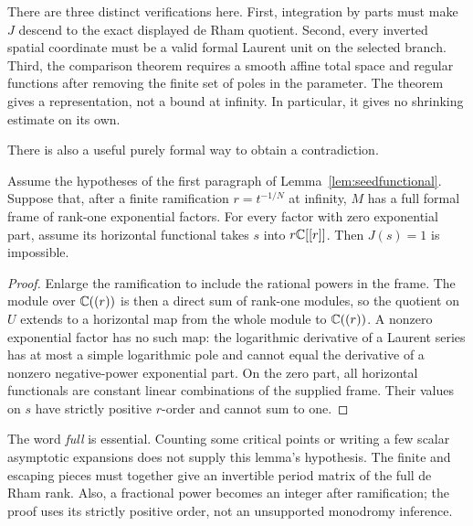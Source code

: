 There are three distinct verifications here. First, integration by
parts must make $J$ descend to the exact displayed de Rham quotient.
Second, every inverted spatial coordinate must be a valid formal
Laurent unit on the selected branch. Third, the comparison theorem
requires a smooth affine total space and regular functions after
removing the finite set of poles in the parameter. The theorem gives
a representation, not a bound at infinity. In particular, it gives
no shrinking estimate on its own.

There is also a useful purely formal way to obtain a contradiction.

\begin{lemma}\label{lem:positiveformal}
Assume the hypotheses of the first paragraph of
Lemma~\ref{lem:seedfunctional}. Suppose that, after a finite ramification
$r=t^{-1/N}$ at infinity, $M$ has a full formal frame of rank-one
exponential factors. For every factor with zero exponential part,
assume its horizontal functional takes $s$ into $r\mathbb C[[r]]$.
Then $J(s)=1$ is impossible.
\end{lemma}
\begin{proof}
Enlarge the ramification to include the rational powers in the frame.
The module over $\mathbb C((r))$ is then a direct sum of rank-one modules,
so the quotient on $U$ extends to a horizontal map from the whole
module to $\mathbb C((r))$. A nonzero exponential factor has no such map:
the logarithmic derivative of a Laurent series has at most a simple
logarithmic pole and cannot equal the derivative of a nonzero
negative-power exponential part. On the zero part, all horizontal
functionals are constant linear combinations of the supplied frame.
Their values on $s$ have strictly positive $r$-order and cannot sum
to one.
\end{proof}

The word \emph{full} is essential. Counting some critical points or
writing a few scalar asymptotic expansions does not supply this lemma's
hypothesis. The finite and escaping pieces must together give an
invertible period matrix of the full de Rham rank. Also, a fractional
power becomes an integer after ramification; the proof uses its
strictly positive order, not an unsupported monodromy inference.
